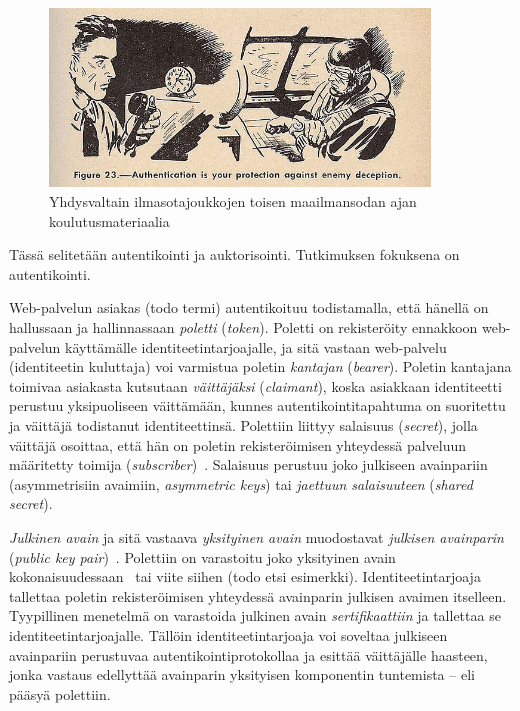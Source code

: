\documentclass[finnish,gradu]{tktltiki}
\begin{document}
  \begin{figure}[h!]
    \centering
    \includegraphics[width=0.9\textwidth]{images/usnavy_authentication.jpg}
    \caption{Yhdysvaltain ilmasotajoukkojen toisen maailmansodan ajan koulutusmateriaalia~\cite{usnavy_authentication}}
    \label{fig:autentikointi_suojaa_viholliselta}
  \end{figure}

  Tässä selitetään autentikointi ja auktorisointi. Tutkimuksen fokuksena on autentikointi.


  Web-palvelun asiakas (todo termi) autentikoituu todistamalla, että hänellä on hallussaan ja hallinnassaan \emph{poletti} (\emph{token}). Poletti on rekisteröity ennakkoon web-palvelun käyttämälle identiteetintarjoajalle, ja sitä vastaan web-palvelu (identiteetin kuluttaja) voi varmistua poletin \emph{kantajan} (\emph{bearer}). Poletin kantajana toimivaa asiakasta kutsutaan \emph{väittäjäksi} (\emph{claimant}), koska asiakkaan identiteetti perustuu yksipuoliseen väittämään, kunnes autentikointitapahtuma on suoritettu ja väittäjä todistanut identiteettinsä. Polettiin liittyy salaisuus (\emph{secret}), jolla väittäjä osoittaa, että hän on poletin rekisteröimisen yhteydessä palveluun määritetty toimija (\emph{subscriber})~\cite{NIST_SP800-63-1}. Salaisuus perustuu joko julkiseen avainpariin (asymmetrisiin avaimiin, \emph{asymmetric keys}) tai \emph{jaettuun salaisuuteen} (\emph{shared secret}).

  \emph{Julkinen avain} ja sitä vastaava \emph{yksityinen avain} muodostavat \emph{julkisen avainparin} (\emph{public key pair})~\cite{NIST_SP800-63-1}.
  Polettiin on varastoitu joko yksityinen avain kokonaisuudessaan~\cite{NIST_SP800-63-1} tai viite siihen (todo etsi esimerkki).
  Identiteetintarjoaja tallettaa poletin rekisteröimisen yhteydessä avainparin julkisen avaimen itselleen. Tyypillinen menetelmä on varastoida julkinen avain \emph{sertifikaattiin} ja tallettaa se identiteetintarjoajalle. Tällöin identiteetintarjoaja voi soveltaa julkiseen avainpariin perustuvaa autentikointiprotokollaa ja esittää väittäjälle haasteen, jonka vastaus edellyttää avainparin yksityisen komponentin tuntemista -- eli pääsyä polettiin.
\end{document}

